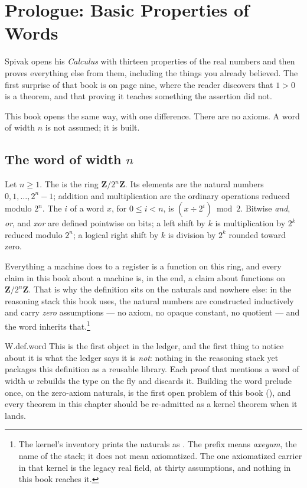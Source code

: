 \chapter{Prologue: Basic Properties of Words}
\label{ch:words}

Spivak opens his \emph{Calculus} with thirteen properties of the real numbers and then proves everything else from them, including the things you already believed. The first surprise of that book is on page nine, where the reader discovers that \(1 > 0\) is a theorem, and that proving it teaches something the assertion did not.

This book opens the same way, with one difference. There are no axioms. A word of width \(n\) is not assumed; it is built.

\section{The word of width \(n\)}
\label{sec:word}

\begin{definition}[title={Word \(n\)}]
Let \(n \geq 1\). The  is the ring \(\mathbf{Z}/2^n\mathbf{Z}\). Its elements are the natural numbers \(0, 1, \dots, 2^n - 1\); addition and multiplication are the ordinary operations reduced modulo \(2^n\). The  \(i\) of a word \(x\), for \(0 \leq i < n\), is \((x \div 2^i) \bmod 2\). Bitwise \emph{and}, \emph{or}, and \emph{xor} are defined pointwise on bits; a left shift by \(k\) is multiplication by \(2^k\) reduced modulo \(2^n\); a logical right shift by \(k\) is division by \(2^k\) rounded toward zero.
\end{definition}

Everything a machine does to a register is a function on this ring, and every claim in this book about a machine is, in the end, a claim about functions on \(\mathbf{Z}/2^n\mathbf{Z}\). That is why the definition sits on the naturals and nowhere else: in the reasoning stack this book uses, the natural numbers are constructed inductively and carry \emph{zero} assumptions --- no axiom, no opaque constant, no quotient --- and the word inherits that.\footnote{The kernel's inventory prints the naturals as . The prefix means \emph{axeyum}, the name of the stack; it does not mean axiomatized. The one axiomatized carrier in that kernel is the legacy real field, at thirty assumptions, and nothing in this book reaches it.}

\begin{artifact}{W.def.word}
This is the first object in the ledger, and the first thing to notice about it is what the ledger says it is \emph{not}: nothing in the reasoning stack yet packages this definition as a reusable library. Each proof that mentions a word of width \(w\) rebuilds the type on the fly and discards it. Building the word prelude once, on the zero-axiom naturals, is the first open problem of this book (), and every theorem in this chapter should be re-admitted as a kernel theorem when it lands.
\end{artifact}

